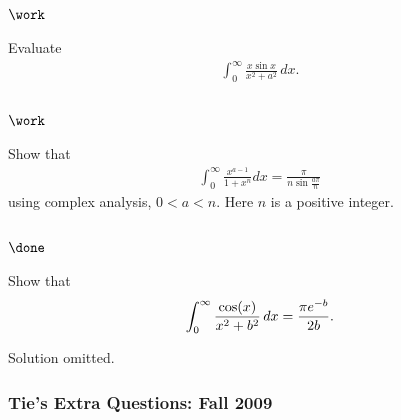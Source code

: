 \hypertarget{work-50}{%
\subsection{\texorpdfstring{\(\work\)}{\textbackslash work}}\label{work-50}}

\begin{problem}[?]

Evaluate
\begin{align*}
\displaystyle{ \int_{0}^{\infty}\frac{x\sin x}{x^2+a^2} \, dx }
.\end{align*}

\end{problem}

\hypertarget{work-51}{%
\subsection{\texorpdfstring{\(\work\)}{\textbackslash work}}\label{work-51}}

\begin{problem}[?]

Show that
\begin{align*}
\displaystyle \int_0^\infty \frac{x^{a-1}}{1+x^n} dx=\frac{\pi}{n\sin \frac{a\pi}{n}}
\end{align*}
using complex analysis, \(0< a < n\). Here \(n\) is a positive integer.

\end{problem}

\hypertarget{done-8}{%
\subsection{\texorpdfstring{\(\done\)}{\textbackslash done}}\label{done-8}}

\begin{problem}[?]

Show that
\begin{align*}
\int_0^{\infty} {\cos(x) \over x^2 + b^2}\,dx= {\pi e^{-b} \over 2b}
.\end{align*}

\end{problem}

Solution omitted.

\hypertarget{ties-extra-questions-fall-2009-5}{%
\subsubsection{Tie's Extra Questions: Fall
2009}\label{ties-extra-questions-fall-2009-5}}

